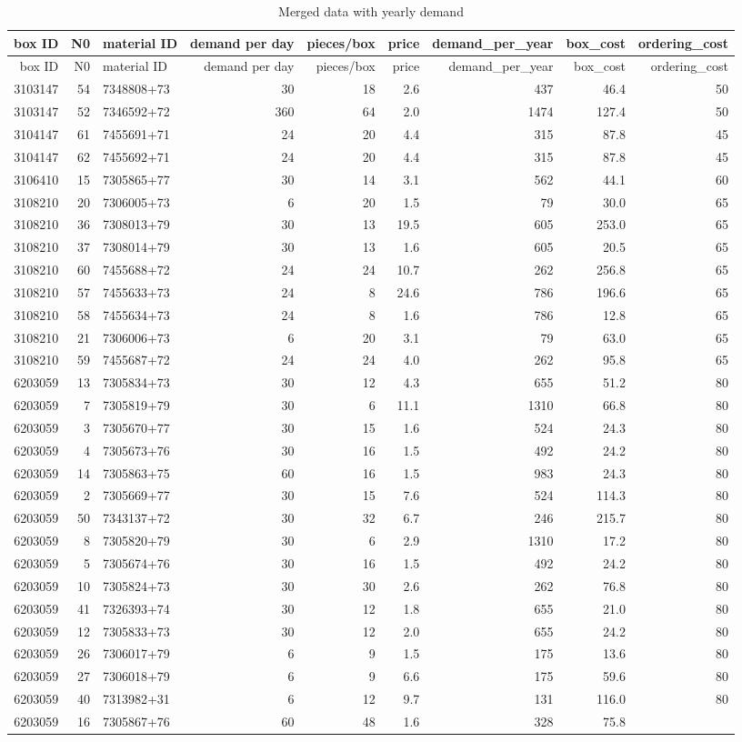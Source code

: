 \documentclass[
]{article}
\begin{document}
\begin{longtable}[]{@{}rrlrrrrrr@{}}
\caption{Merged data with yearly demand}\tabularnewline
\toprule
box ID & N0 & material ID & demand per day & pieces/box & price &
demand\_per\_year & box\_cost & ordering\_cost\tabularnewline
\midrule
\endfirsthead
\toprule
box ID & N0 & material ID & demand per day & pieces/box & price &
demand\_per\_year & box\_cost & ordering\_cost\tabularnewline
\midrule
\endhead
3103147 & 54 & 7348808+73 & 30 & 18 & 2.6 & 437 & 46.4 &
50\tabularnewline
3103147 & 52 & 7346592+72 & 360 & 64 & 2.0 & 1474 & 127.4 &
50\tabularnewline
3104147 & 61 & 7455691+71 & 24 & 20 & 4.4 & 315 & 87.8 &
45\tabularnewline
3104147 & 62 & 7455692+71 & 24 & 20 & 4.4 & 315 & 87.8 &
45\tabularnewline
3106410 & 15 & 7305865+77 & 30 & 14 & 3.1 & 562 & 44.1 &
60\tabularnewline
3108210 & 20 & 7306005+73 & 6 & 20 & 1.5 & 79 & 30.0 & 65\tabularnewline
3108210 & 36 & 7308013+79 & 30 & 13 & 19.5 & 605 & 253.0 &
65\tabularnewline
3108210 & 37 & 7308014+79 & 30 & 13 & 1.6 & 605 & 20.5 &
65\tabularnewline
3108210 & 60 & 7455688+72 & 24 & 24 & 10.7 & 262 & 256.8 &
65\tabularnewline
3108210 & 57 & 7455633+73 & 24 & 8 & 24.6 & 786 & 196.6 &
65\tabularnewline
3108210 & 58 & 7455634+73 & 24 & 8 & 1.6 & 786 & 12.8 &
65\tabularnewline
3108210 & 21 & 7306006+73 & 6 & 20 & 3.1 & 79 & 63.0 & 65\tabularnewline
3108210 & 59 & 7455687+72 & 24 & 24 & 4.0 & 262 & 95.8 &
65\tabularnewline
6203059 & 13 & 7305834+73 & 30 & 12 & 4.3 & 655 & 51.2 &
80\tabularnewline
6203059 & 7 & 7305819+79 & 30 & 6 & 11.1 & 1310 & 66.8 &
80\tabularnewline
6203059 & 3 & 7305670+77 & 30 & 15 & 1.6 & 524 & 24.3 &
80\tabularnewline
6203059 & 4 & 7305673+76 & 30 & 16 & 1.5 & 492 & 24.2 &
80\tabularnewline
6203059 & 14 & 7305863+75 & 60 & 16 & 1.5 & 983 & 24.3 &
80\tabularnewline
6203059 & 2 & 7305669+77 & 30 & 15 & 7.6 & 524 & 114.3 &
80\tabularnewline
6203059 & 50 & 7343137+72 & 30 & 32 & 6.7 & 246 & 215.7 &
80\tabularnewline
6203059 & 8 & 7305820+79 & 30 & 6 & 2.9 & 1310 & 17.2 &
80\tabularnewline
6203059 & 5 & 7305674+76 & 30 & 16 & 1.5 & 492 & 24.2 &
80\tabularnewline
6203059 & 10 & 7305824+73 & 30 & 30 & 2.6 & 262 & 76.8 &
80\tabularnewline
6203059 & 41 & 7326393+74 & 30 & 12 & 1.8 & 655 & 21.0 &
80\tabularnewline
6203059 & 12 & 7305833+73 & 30 & 12 & 2.0 & 655 & 24.2 &
80\tabularnewline
6203059 & 26 & 7306017+79 & 6 & 9 & 1.5 & 175 & 13.6 & 80\tabularnewline
6203059 & 27 & 7306018+79 & 6 & 9 & 6.6 & 175 & 59.6 & 80\tabularnewline
6203059 & 40 & 7313982+31 & 6 & 12 & 9.7 & 131 & 116.0 &
80\tabularnewline
6203059 & 16 & 7305867+76 & 60 & 48 & 1.6 & 328 & 75.8 &

\end{longtable}
\end{document}
